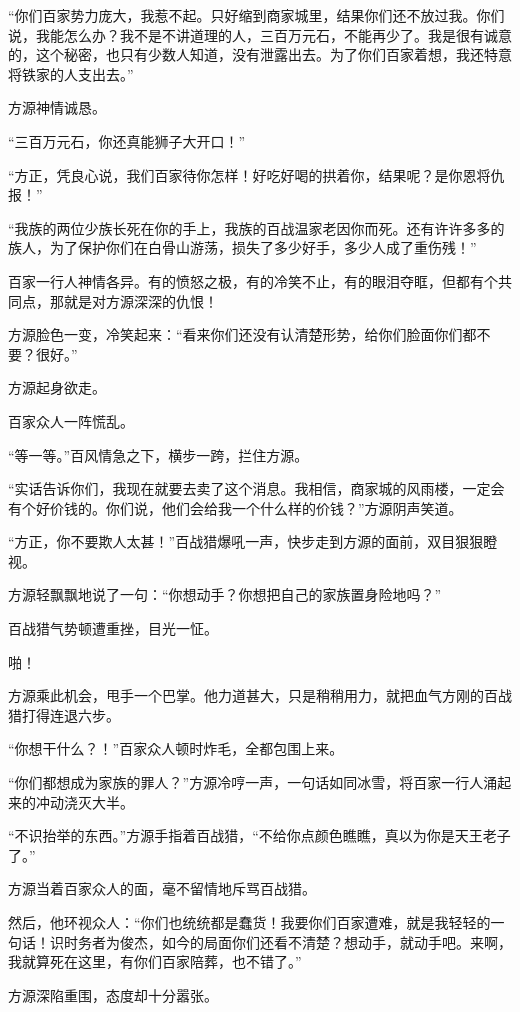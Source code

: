 \begin{this_body}
“你们百家势力庞大，我惹不起。只好缩到商家城里，结果你们还不放过我。你们说，我能怎么办？我不是不讲道理的人，三百万元石，不能再少了。我是很有诚意的，这个秘密，也只有少数人知道，没有泄露出去。为了你们百家着想，我还特意将铁家的人支出去。”

方源神情诚恳。

“三百万元石，你还真能狮子大开口！”

“方正，凭良心说，我们百家待你怎样！好吃好喝的拱着你，结果呢？是你恩将仇报！”

“我族的两位少族长死在你的手上，我族的百战温家老因你而死。还有许许多多的族人，为了保护你们在白骨山游荡，损失了多少好手，多少人成了重伤残！”

百家一行人神情各异。有的愤怒之极，有的冷笑不止，有的眼泪夺眶，但都有个共同点，那就是对方源深深的仇恨！

方源脸色一变，冷笑起来：“看来你们还没有认清楚形势，给你们脸面你们都不要？很好。”

方源起身欲走。

百家众人一阵慌乱。

“等一等。”百风情急之下，横步一跨，拦住方源。

“实话告诉你们，我现在就要去卖了这个消息。我相信，商家城的风雨楼，一定会有个好价钱的。你们说，他们会给我一个什么样的价钱？”方源阴声笑道。

“方正，你不要欺人太甚！”百战猎爆吼一声，快步走到方源的面前，双目狠狠瞪视。

方源轻飘飘地说了一句：“你想动手？你想把自己的家族置身险地吗？”

百战猎气势顿遭重挫，目光一怔。

啪！

方源乘此机会，甩手一个巴掌。他力道甚大，只是稍稍用力，就把血气方刚的百战猎打得连退六步。

“你想干什么？！”百家众人顿时炸毛，全都包围上来。

“你们都想成为家族的罪人？”方源冷哼一声，一句话如同冰雪，将百家一行人涌起来的冲动浇灭大半。

“不识抬举的东西。”方源手指着百战猎，“不给你点颜色瞧瞧，真以为你是天王老子了。”

方源当着百家众人的面，毫不留情地斥骂百战猎。

然后，他环视众人：“你们也统统都是蠢货！我要你们百家遭难，就是我轻轻的一句话！识时务者为俊杰，如今的局面你们还看不清楚？想动手，就动手吧。来啊，我就算死在这里，有你们百家陪葬，也不错了。”

方源深陷重围，态度却十分嚣张。


\end{this_body}
